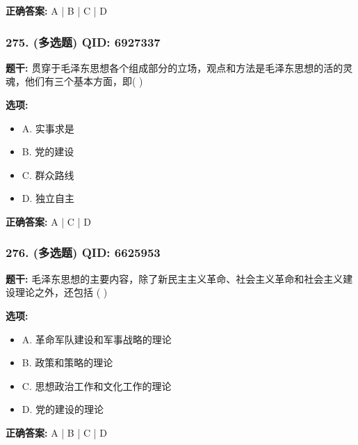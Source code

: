 \documentclass[12pt,UTF8]{ctexart}
\begin{document}
\textbf{正确答案:}
A | B | C | D

\vspace{0.3em}\hrulefill\vspace{0.7em}

\subsubsection*{275. (多选题) \small QID: 6927337}

\textbf{题干:}
贯穿于毛泽东思想各个组成部分的立场，观点和方法是毛泽东思想的活的灵魂，他们有三个基本方面，即(    )

\textbf{选项:}
\begin{itemize}[leftmargin=*]

  \item A. 实事求是

  \item B. 党的建设

  \item C. 群众路线

  \item D. 独立自主

\end{itemize}

\textbf{正确答案:}
A | C | D

\vspace{0.3em}\hrulefill\vspace{0.7em}

\subsubsection*{276. (多选题) \small QID: 6625953}

\textbf{题干:}
毛泽东思想的主要内容，除了新民主主义革命、社会主义革命和社会主义建设理论之外，还包括 ( )

\textbf{选项:}
\begin{itemize}[leftmargin=*]

  \item A. 革命军队建设和军事战略的理论

  \item B. 政策和策略的理论

  \item C. 思想政治工作和文化工作的理论

  \item D. 党的建设的理论

\end{itemize}

\textbf{正确答案:}
A | B | C | D
\end{document}
